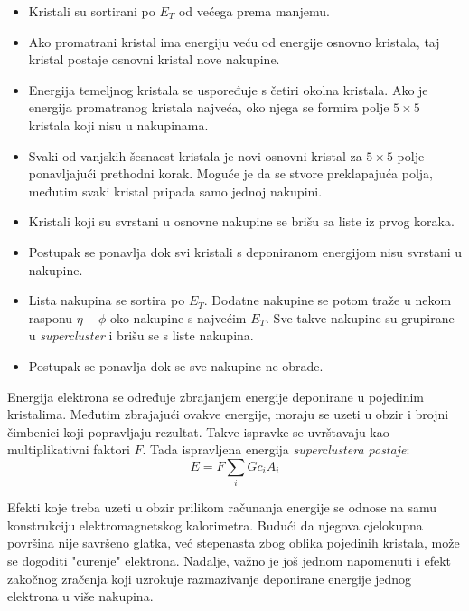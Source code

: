 \documentclass[a4paper,12pt]{report}
\begin{document}
\begin{itemize}
 \item Kristali su sortirani po $E_T$ od većega prema manjemu.
  \item Ako promatrani kristal ima energiju veću od energije osnovno kristala, taj kristal postaje osnovni kristal nove nakupine.
  \item Energija temeljnog kristala se uspoređuje s četiri okolna kristala. Ako je energija promatranog kristala najveća, oko njega se formira polje $5\times 5$ kristala koji nisu u nakupinama.
  \item Svaki od vanjskih šesnaest kristala je novi osnovni kristal za $5\times 5$ polje ponavljajući prethodni korak. Moguće je da se stvore preklapajuća polja, međutim svaki kristal pripada samo jednoj nakupini.
  \item Kristali koji su svrstani u osnovne nakupine se brišu sa liste iz prvog koraka.
  \item Postupak se ponavlja dok svi kristali s deponiranom energijom nisu svrstani u nakupine.
  \item Lista nakupina se sortira po $E_T$. Dodatne nakupine se potom traže u nekom rasponu $\eta-\phi$ oko nakupine s najvećim $E_T$. Sve takve nakupine su grupirane u \textit{supercluster} i brišu se s liste nakupina.
  \item Postupak se ponavlja dok se sve nakupine ne obrade.

\end{itemize}

Energija elektrona se određuje zbrajanjem energije deponirane u pojedinim kristalima. Međutim zbrajajući ovakve energije, moraju se uzeti u obzir i brojni čimbenici koji popravljaju rezultat. Takve ispravke se uvrštavaju kao multiplikativni faktori $F$. Tada ispravljena energija \textit{superclustera postaje}:
\begin{equation}
 E=F\sum_i Gc_iA_i
\label{equ:ecal_energija}
\end{equation}

Efekti koje treba uzeti u obzir prilikom računanja energije se odnose na samu konstrukciju elektromagnetskog kalorimetra. Budući da njegova cjelokupna površina nije savršeno glatka, već stepenasta zbog oblika pojedinih kristala, može se dogoditi "curenje" elektrona. Nadalje, važno je još jednom napomenuti  i efekt zakočnog zračenja koji uzrokuje razmazivanje deponirane energije jednog elektrona u više nakupina.\\
\end{document}
